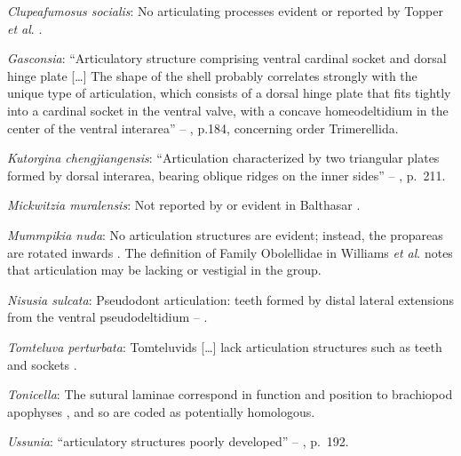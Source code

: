 \documentclass[openany]{book}
\theoremstyle{definition}
\theoremstyle{definition}
\theoremstyle{definition}
\theoremstyle{remark}
\begin{document}
\hypertarget{Clupeafumosus_socialis-coding-66}{}
\emph{Clupeafumosus socialis}: No articulating processes evident or
reported by Topper \emph{et al}. \citeyearpar{Topper2013Reappraisalof}.

\hypertarget{Gasconsia-coding-66}{}
\emph{Gasconsia}: ``Articulatory structure comprising ventral cardinal
socket and dorsal hinge plate {[}\ldots{}{]} The shape of the shell
probably correlates strongly with the unique type of articulation, which
consists of a dorsal hinge plate that fits tightly into a cardinal
socket in the ventral valve, with a concave homeodeltidium in the center
of the ventral interarea'' --
\citet{Williams2000LinguliformeaCraniiformea}, p.184, concerning order
Trimerellida.

\hypertarget{Kutorgina_chengjiangensis-coding-66}{}
\emph{Kutorgina chengjiangensis}: ``Articulation characterized by two
triangular plates formed by dorsal interarea, bearing oblique ridges on
the inner sides'' -- \citet{Williams2000LinguliformeaCraniiformea},
p.~211.

\hypertarget{Mickwitzia_muralensis-coding-66}{}
\emph{Mickwitzia muralensis}: Not reported by or evident in Balthasar
\citeyearpar{Balthasar2004Shellstructure}.

\hypertarget{Mummpikia_nuda-coding-66}{}
\emph{Mummpikia nuda}: No articulation structures are evident; instead,
the propareas are rotated inwards \citep{Balthasar2008iMummpikia}. The
definition of Family Obolellidae in Williams \emph{et al}.
\citeyearpar{Williams2000LinguliformeaCraniiformea} notes that
articulation may be lacking or vestigial in the group.

\hypertarget{Nisusia_sulcata-coding-66}{}
\emph{Nisusia sulcata}: Pseudodont articulation: teeth formed by distal
lateral extensions from the ventral pseudodeltidium --
\citet{Holmer2018Evolutionarysignificance}.

\hypertarget{Tomteluva_perturbata-coding-66}{}
\emph{Tomteluva perturbata}: Tomteluvids {[}\ldots{}{]} lack
articulation structures such as teeth and sockets
\citep{Streng2016Anew}.

\hypertarget{Tonicella-coding-66}{}
\emph{Tonicella}: The sutural laminae correspond in function and
position to brachiopod apophyses \citep{Connors2012}, and so are coded
as potentially homologous.

\hypertarget{Ussunia-coding-66}{}
\emph{Ussunia}: ``articulatory structures poorly developed'' --
\citet{Williams2000LinguliformeaCraniiformea}, p.~192.
\end{document}
